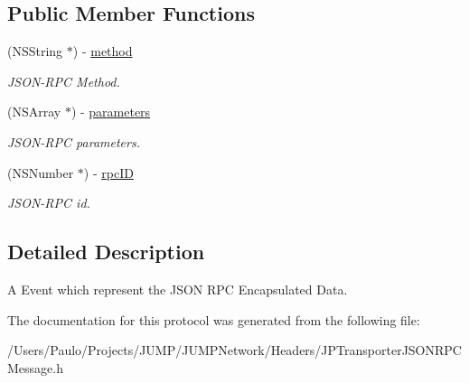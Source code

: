 \subsection*{Public Member Functions}
\begin{DoxyCompactItemize}
\item 
\hypertarget{a00041_ade40198560090cabaf5b8a76b1d9af42}{
(NSString $\ast$) -\/ \hyperlink{a00041_ade40198560090cabaf5b8a76b1d9af42}{method}}
\label{a00041_ade40198560090cabaf5b8a76b1d9af42}

\begin{DoxyCompactList}\small\item\em JSON-\/RPC Method. \item\end{DoxyCompactList}\item 
\hypertarget{a00041_a32c1360e57655812c62599d5d1f9d5c3}{
(NSArray $\ast$) -\/ \hyperlink{a00041_a32c1360e57655812c62599d5d1f9d5c3}{parameters}}
\label{a00041_a32c1360e57655812c62599d5d1f9d5c3}

\begin{DoxyCompactList}\small\item\em JSON-\/RPC parameters. \item\end{DoxyCompactList}\item 
\hypertarget{a00041_aea883f630b43684c534ee095624d7226}{
(NSNumber $\ast$) -\/ \hyperlink{a00041_aea883f630b43684c534ee095624d7226}{rpcID}}
\label{a00041_aea883f630b43684c534ee095624d7226}

\begin{DoxyCompactList}\small\item\em JSON-\/RPC id. \item\end{DoxyCompactList}\end{DoxyCompactItemize}


\subsection{Detailed Description}
A Event which represent the JSON RPC Encapsulated Data. 

The documentation for this protocol was generated from the following file:\begin{DoxyCompactItemize}
\item 
/Users/Paulo/Projects/JUMP/JUMPNetwork/Headers/JPTransporterJSONRPCMessage.h\end{DoxyCompactItemize}

